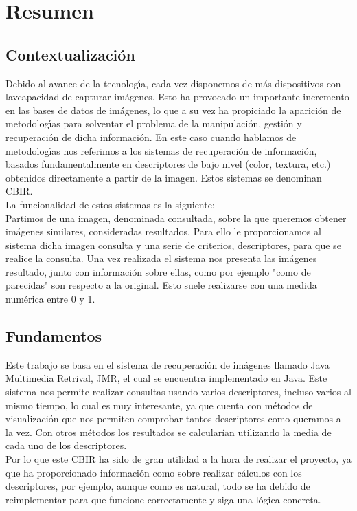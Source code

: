 \chapter{Resumen}
\label{cap:resumen}

\section{Contextualización}

Debido al avance de la tecnologı́a, cada vez disponemos de más dispositivos con lavcapacidad de capturar imágenes. Esto ha provocado un importante incremento en las bases de datos de imágenes, lo que a su vez ha propiciado la aparición de metodologı́as para solventar el problema de la manipulación, gestión y recuperación de dicha información. En este caso cuando hablamos de metodologı́as nos referimos a los sistemas de recuperación de información, basados fundamentalmente en descriptores de bajo nivel (color, textura, etc.) obtenidos directamente a partir de la imagen. Estos sistemas se denominan CBIR.\\

La funcionalidad de estos sistemas es la siguiente:\\

Partimos de una imagen, denominada consultada, sobre la que queremos obtener imágenes similares, consideradas resultados. Para ello le proporcionamos al sistema dicha imagen consulta y una serie de criterios, descriptores, para que se realice la consulta. Una vez realizada el sistema nos presenta las imágenes resultado, junto con información sobre ellas, como por ejemplo "como de parecidas" son respecto a la original. Esto suele realizarse con una medida numérica entre 0 y 1.\\


\section{Fundamentos}

Este trabajo se basa en el sistema de recuperación de imágenes llamado Java Multimedia Retrival, JMR, el cual se encuentra implementado en Java. Este sistema nos permite realizar consultas usando varios descriptores, incluso varios al mismo tiempo, lo cual es muy interesante, ya que cuenta con métodos de visualización que nos permiten comprobar tantos descriptores como queramos a la vez. Con otros métodos los resultados se calcularían utilizando la media de cada uno de los descriptores.\\

Por lo que este CBIR ha sido de gran utilidad a la hora de realizar el proyecto, ya que ha proporcionado información como sobre realizar cálculos con los descriptores, por ejemplo, aunque como es natural, todo se ha debido de reimplementar para que funcione correctamente y siga una lógica concreta.\\








